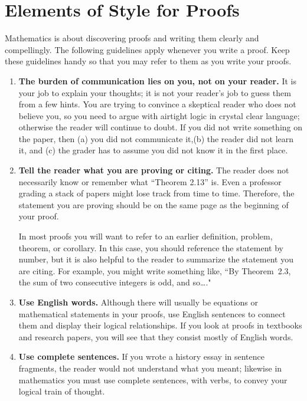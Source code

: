 \appendix
\chapter{Elements of Style for Proofs}
\label{appendix:elements_of_style}

Mathematics is about discovering proofs and writing them clearly and compellingly. The following guidelines apply whenever you write a proof.  Keep these guidelines handy so that you may refer to them as you write your proofs.

\begin{enumerate}

\item \textbf{The burden of communication lies on you, not on your reader.}
It is your job to explain your thoughts; it is not your reader's job to guess them from a few hints. You are trying to convince a skeptical reader who does not believe you, so you need to argue with airtight logic in crystal clear language; otherwise the reader will continue to doubt. If you did not write something on the paper, then (a) you did not communicate it,(b) the reader did not learn it, and (c) the grader has to assume you did not know it in the first place.
          
\item \textbf{Tell the reader what you are proving or citing.}
The reader does not necessarily know or remember what ``Theorem 2.13'' is. Even a professor grading a stack of papers might lose track from time to time. Therefore, the statement you are proving should be on the same page as the beginning of your proof. 

In most proofs you will want to refer to an earlier definition, problem, theorem, or corollary.  In this case, you should reference the statement by number, but it is also helpful to the reader to summarize the statement you are citing.  For example, you might write something like, ``By Theorem~2.3, the sum of two consecutive integers is odd, and so\ldots."

\item \textbf{Use English words.}
Although there will usually be equations or mathematical statements in your proofs, use English sentences to connect them and display their logical relationships. If you look at proofs in textbooks and research papers, you will see that they consist mostly of English words.

\item \textbf{Use complete sentences.}
If you wrote a history essay in sentence fragments, the reader would not understand what you meant; likewise in mathematics you must use complete sentences, with verbs, to convey your logical train of thought.
        

\end{enumerate}
